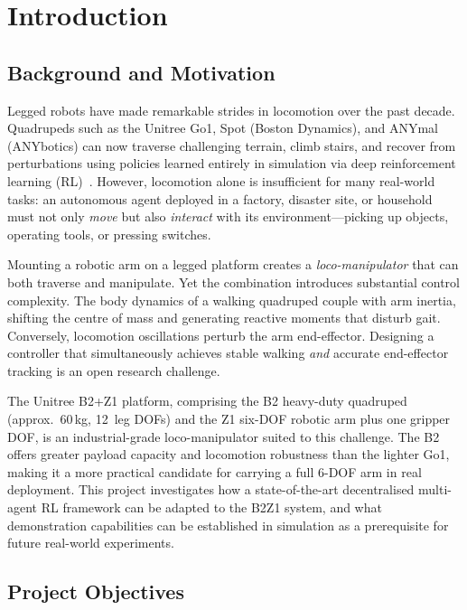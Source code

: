 
\chapter{Introduction}
\label{chp:intro}

\section{Background and Motivation}

Legged robots have made remarkable strides in locomotion over the past
decade.  Quadrupeds such as the Unitree Go1, Spot (Boston Dynamics), and
ANYmal (ANYbotics) can now traverse challenging terrain, climb stairs, and
recover from perturbations using policies learned entirely in simulation via
deep reinforcement learning (RL)~\cite{lee2020learning,margolis2023walk}.
However, locomotion alone is insufficient for many real-world tasks: an
autonomous agent deployed in a factory, disaster site, or household must not
only \emph{move} but also \emph{interact} with its environment---picking up
objects, operating tools, or pressing switches.

Mounting a robotic arm on a legged platform creates a \emph{loco-manipulator}
that can both traverse and manipulate.  Yet the combination introduces
substantial control complexity.
The body dynamics of a walking quadruped couple with arm inertia, shifting
the centre of mass and generating reactive moments that disturb gait.
Conversely, locomotion oscillations perturb the arm end-effector.
Designing a controller that simultaneously achieves stable walking
\emph{and} accurate end-effector tracking is an open research challenge.

The Unitree B2+Z1 platform, comprising the B2 heavy-duty quadruped (approx.\
60\,kg, 12~leg DOFs) and the Z1 six-DOF robotic arm plus one gripper DOF,
is an industrial-grade loco-manipulator suited to this challenge.
The B2 offers greater payload capacity and locomotion robustness than the
lighter Go1, making it a more practical candidate for carrying a full 6-DOF
arm in real deployment.
This project investigates how a state-of-the-art decentralised multi-agent RL
framework can be adapted to the B2Z1 system, and what demonstration
capabilities can be established in simulation as a prerequisite for future
real-world experiments.

\section{Project Objectives}

